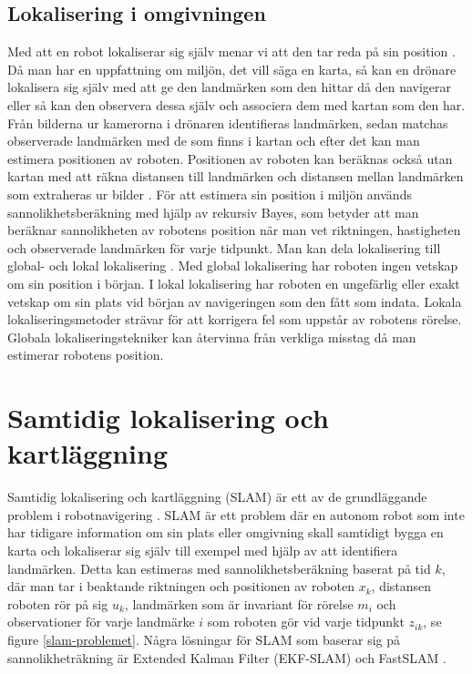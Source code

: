 \section{Lokalisering i omgivningen}

Med att en robot lokaliserar sig själv menar vi att den tar reda på sin position \citep{982903}. Då man har en uppfattning om miljön, det vill säga en karta, så kan en drönare lokalisera sig själv med att ge den landmärken som den hittar då den navigerar eller så kan den observera dessa själv och associera dem med kartan som den har. Från bilderna ur kamerorna i drönaren identifieras landmärken, sedan matchas observerade landmärken med de som finns i kartan och efter det kan man estimera positionen av roboten. Positionen av roboten kan beräknas också utan kartan med att räkna distansen till landmärken och distansen mellan landmärken som extraheras ur bilder \citep{realslamproblem}. För att estimera sin position i miljön används sannolikhetsberäkning med hjälp av rekursiv Bayes, som betyder att man beräknar sannolikheten av robotens position när man vet riktningen, hastigheten och observerade landmärken för varje tidpunkt. Man kan dela lokalisering till global- och lokal lokalisering \citep{982903, globalsubmaps}. Med global lokalisering har roboten ingen vetskap om sin position i början. I lokal lokalisering har roboten en ungefärlig eller exakt vetskap om sin plats vid början av navigeringen som den fått som indata. Lokala lokaliseringsmetoder strävar för att korrigera fel som uppstår av robotens rörelse. Globala lokaliseringstekniker kan återvinna från verkliga misstag då man estimerar robotens position.

\chapter{Samtidig lokalisering och kartläggning}

Samtidig lokalisering och kartläggning (SLAM) är ett av de grundläggande problem i robotnavigering \citep{realslamproblem}. SLAM är ett problem där en autonom robot som inte har tidigare information om sin plats eller omgivning skall samtidigt bygga en karta och lokaliserar sig själv till exempel med hjälp av att identifiera landmärken. Detta kan estimeras med sannolikhetsberäkning baserat på tid $k$, där man tar i beaktande riktningen och positionen av roboten $x_k$, distansen roboten rör på sig $u_k$, landmärken som är invariant för rörelse $m_i$ och observationer för varje landmärke $i$ som roboten gör vid varje tidpunkt $z_{ik}$, se figure \ref{slam-problemet}. Några lösningar för SLAM som baserar sig på sannolikheträkning är Extended Kalman Filter (EKF-SLAM) och FastSLAM \citep{realslamproblem}. 

